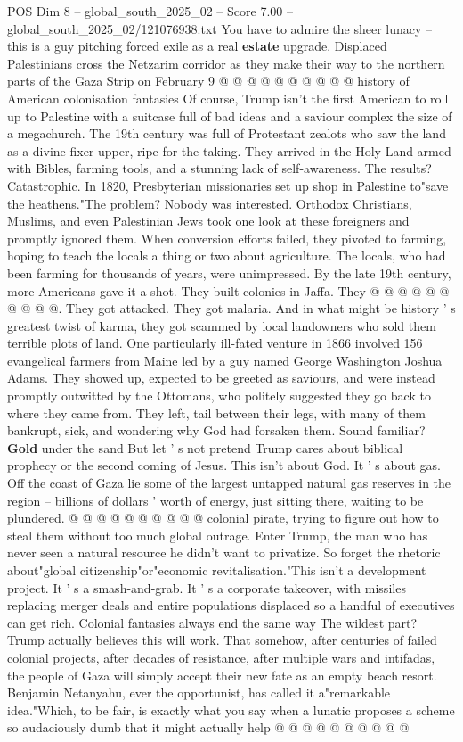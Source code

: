 \begin{textsample}{POS Dim 8 – global\_south\_2025\_02 – Score 7.00 – global\_south\_2025\_02/121076938.txt}
You have to admire the sheer lunacy -- this is a guy pitching forced exile as a real \textbf{estate} upgrade.
Displaced Palestinians cross the Netzarim corridor as they make their way to the northern parts of the Gaza Strip on February 9 @ @ @ @ @ @ @ @ @ @ history of American colonisation fantasies Of course, Trump isn't the first American to roll up to Palestine with a suitcase full of bad ideas and a saviour complex the size of a megachurch.
The 19th century was full of Protestant zealots who saw the land as a divine fixer-upper, ripe for the taking.
They arrived in the Holy Land armed with Bibles, farming tools, and a stunning lack of self-awareness.
The results?
Catastrophic.
In 1820, Presbyterian missionaries set up shop in Palestine to"save the heathens."The problem?
Nobody was interested.
Orthodox Christians, Muslims, and even Palestinian Jews took one look at these foreigners and promptly ignored them.
When conversion efforts failed, they pivoted to farming, hoping to teach the locals a thing or two about agriculture.
The locals, who had been farming for thousands of years, were unimpressed.
By the late 19th century, more Americans gave it a shot.
They built colonies in Jaffa.
They @ @ @ @ @ @ @ @ @ @.
They got attacked.
They got malaria.
And in what might be history ' s greatest twist of karma, they got scammed by local landowners who sold them terrible plots of land.
One particularly ill-fated venture in 1866 involved 156 evangelical farmers from Maine led by a guy named George Washington Joshua Adams.
They showed up, expected to be greeted as saviours, and were instead promptly outwitted by the Ottomans, who politely suggested they go back to where they came from.
They left, tail between their legs, with many of them bankrupt, sick, and wondering why God had forsaken them.
Sound familiar? \textbf{Gold} under the sand But let ' s not pretend Trump cares about biblical prophecy or the second coming of Jesus.
This isn't about God.
It ' s about gas.
Off the coast of Gaza lie some of the largest untapped natural gas reserves in the region -- billions of dollars ' worth of energy, just sitting there, waiting to be plundered. @ @ @ @ @ @ @ @ @ @ colonial pirate, trying to figure out how to steal them without too much global outrage.
Enter Trump, the man who has never seen a natural resource he didn't want to privatize.
So forget the rhetoric about"global citizenship"or"economic revitalisation."This isn't a development project.
It ' s a smash-and-grab.
It ' s a corporate takeover, with missiles replacing merger deals and entire populations displaced so a handful of executives can get rich.
Colonial fantasies always end the same way The wildest part?
Trump actually believes this will work.
That somehow, after centuries of failed colonial projects, after decades of resistance, after multiple wars and intifadas, the people of Gaza will simply accept their new fate as an empty beach resort.
Benjamin Netanyahu, ever the opportunist, has called it a"remarkable idea."Which, to be fair, is exactly what you say when a lunatic proposes a scheme so audaciously dumb that it might actually help @ @ @ @ @ @ @ @ @ @

\end{textsample}
